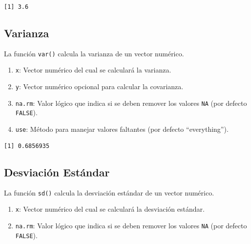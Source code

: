 \documentclass[
  spanish,
  letterpaper,
]{book}
\newenvironment{Shaded}{\begin{snugshade}}{\end{snugshade}}
\newcommand{\CommentTok}[1]{\textcolor[rgb]{0.37,0.37,0.37}{#1}}
\newcommand{\FunctionTok}[1]{\textcolor[rgb]{0.28,0.35,0.67}{#1}}
\newcommand{\NormalTok}[1]{\textcolor[rgb]{0.00,0.23,0.31}{#1}}
\newcommand{\SpecialCharTok}[1]{\textcolor[rgb]{0.37,0.37,0.37}{#1}}
\begin{document}
\begin{verbatim}
[1] 3.6
\end{verbatim}

\subsection{Varianza}\label{varianza-1}

La función \texttt{var()} calcula la varianza de un vector numérico.

\begin{enumerate}
\def\labelenumi{\arabic{enumi}.}
\item
  \texttt{x}: Vector numérico del cual se calculará la varianza.
\item
  \texttt{y}: Vector numérico opcional para calcular la covarianza.
\item
  \texttt{na.rm}: Valor lógico que indica si se deben remover los
  valores \texttt{NA} (por defecto \texttt{FALSE}).
\item
  \texttt{use}: Método para manejar valores faltantes (por defecto
  ``everything'').
\end{enumerate}

\begin{Shaded}
\end{Shaded}

\begin{verbatim}
[1] 0.6856935
\end{verbatim}

\subsection{Desviación Estándar}\label{desviaciuxf3n-estuxe1ndar-1}

La función \texttt{sd()} calcula la desviación estándar de un vector
numérico.

\begin{enumerate}
\def\labelenumi{\arabic{enumi}.}
\item
  \texttt{x}: Vector numérico del cual se calculará la desviación
  estándar.
\item
  \texttt{na.rm}: Valor lógico que indica si se deben remover los
  valores \texttt{NA} (por defecto \texttt{FALSE}).
\end{enumerate}
\end{document}
